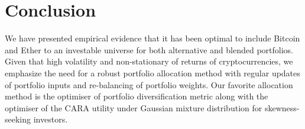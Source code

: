 \documentclass[pdftex,11pt,a4paper] {article}
\begin{document}
\section{Conclusion}

We have presented empirical evidence that it has been optimal to include Bitcoin and Ether to an investable universe for both alternative and blended portfolios. Given that high volatility and non-stationary of returns of cryptocurrencies, we emphasize the need for a robust portfolio allocation method with regular updates of portfolio inputs and re-balancing of portfolio weights. Our favorite allocation method is the optimiser of portfolio diversification metric along with the optimiser of the CARA utility under Gaussian mixture distribution for skewness-seeking investors.
\end{document}
